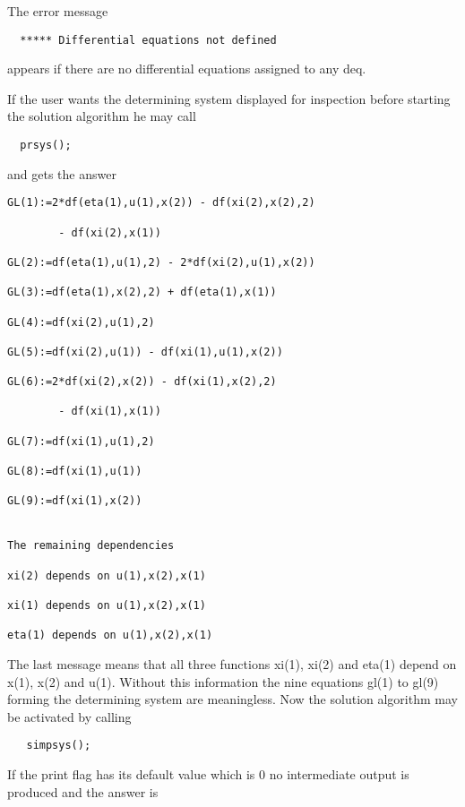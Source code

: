 The error message

\begin{verbatim}
  ***** Differential equations not defined
\end{verbatim}

appears if there are no differential equations assigned to any deq.

If the user wants the determining system displayed for inspection
before starting the solution algorithm he may call

\hypertarget{operator:PRSYS}{}
\begin{verbatim}
  prsys();
\end{verbatim}

and gets the answer

\begin{verbatim}
GL(1):=2*df(eta(1),u(1),x(2)) - df(xi(2),x(2),2)

        - df(xi(2),x(1))

GL(2):=df(eta(1),u(1),2) - 2*df(xi(2),u(1),x(2))

GL(3):=df(eta(1),x(2),2) + df(eta(1),x(1))

GL(4):=df(xi(2),u(1),2)

GL(5):=df(xi(2),u(1)) - df(xi(1),u(1),x(2))

GL(6):=2*df(xi(2),x(2)) - df(xi(1),x(2),2)

        - df(xi(1),x(1))

GL(7):=df(xi(1),u(1),2)

GL(8):=df(xi(1),u(1))

GL(9):=df(xi(1),x(2))


The remaining dependencies

xi(2) depends on u(1),x(2),x(1)

xi(1) depends on u(1),x(2),x(1)

eta(1) depends on u(1),x(2),x(1)
\end{verbatim}

The last message means that all three functions xi(1), xi(2) and
eta(1) depend on x(1), x(2) and u(1). Without this information the
nine equations gl(1) to gl(9) forming the determining system are
meaningless. Now the solution algorithm may be activated by calling

\begin{verbatim}
   simpsys();
\end{verbatim}

If the print flag  has its default value which is 0 no
intermediate output is produced and the answer is

